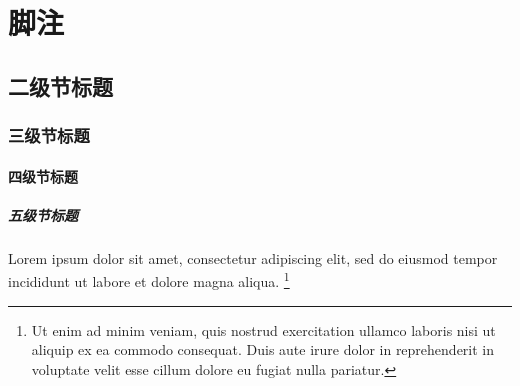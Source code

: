 \section{脚注}

\subsection{二级节标题}

\subsubsection{三级节标题}

\paragraph{四级节标题}

\subparagraph{五级节标题}

Lorem ipsum dolor sit amet, consectetur adipiscing elit, sed do eiusmod tempor
incididunt ut labore et dolore magna aliqua.
\footnote{Ut enim ad minim veniam, quis nostrud exercitation ullamco laboris
  nisi ut aliquip ex ea commodo consequat.
  Duis aute irure dolor in reprehenderit in voluptate velit esse cillum dolore
  eu fugiat nulla pariatur.}
